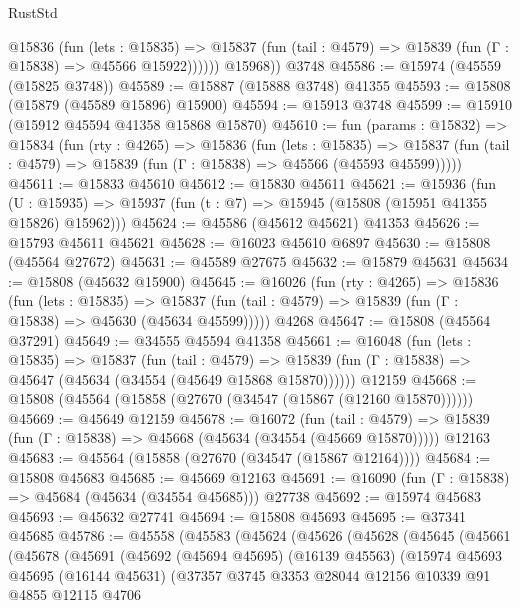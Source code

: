 \begin{lexlean}{RustStd}
\begin{coremodule}
            @15836
              (fun (lets : @15835) =>
              @15837 (fun (tail : @4579) => @15839 (fun (Γ : @15838) => @45566 @15922))))))
        @15968))
    @3748
@45586 := @15974 (@45559 (@15825 @3748))
@45589 := @15887 (@15888 @3748) @41355
@45593 := @15808 (@15879 (@45589 @15896) @15900)
@45594 := @15913 @3748
@45599 := @15910 (@15912 @45594 @41358 @15868 @15870)
@45610 := fun (params : @15832) =>
  @15834
    (fun (rty : @4265) =>
    @15836
      (fun (lets : @15835) =>
      @15837 (fun (tail : @4579) => @15839 (fun (Γ : @15838) => @45566 (@45593 @45599)))))
@45611 := @15833 @45610
@45612 := @15830 @45611
@45621 := @15936
    (fun (U : @15935) => @15937 (fun (t : @7) => @15945 (@15808 (@15951 @41355 @15826) @15962)))
@45624 := @45586 (@45612 @45621) @41353
@45626 := @15793 @45611 @45621
@45628 := @16023 @45610 @6897
@45630 := @15808 (@45564 @27672)
@45631 := @45589 @27675
@45632 := @15879 @45631
@45634 := @15808 (@45632 @15900)
@45645 := @16026
    (fun (rty : @4265) =>
    @15836
      (fun (lets : @15835) =>
      @15837 (fun (tail : @4579) => @15839 (fun (Γ : @15838) => @45630 (@45634 @45599)))))
    @4268
@45647 := @15808 (@45564 @37291)
@45649 := @34555 @45594 @41358
@45661 := @16048
    (fun (lets : @15835) =>
    @15837
      (fun (tail : @4579) =>
      @15839 (fun (Γ : @15838) => @45647 (@45634 (@34554 (@45649 @15868 @15870))))))
    @12159
@45668 := @15808 (@45564 (@15858 (@27670 (@34547 (@15867 (@12160 @15870))))))
@45669 := @45649 @12159
@45678 := @16072
    (fun (tail : @4579) => @15839 (fun (Γ : @15838) => @45668 (@45634 (@34554 (@45669 @15870)))))
    @12163
@45683 := @45564 (@15858 (@27670 (@34547 (@15867 @12164))))
@45684 := @15808 @45683
@45685 := @45669 @12163
@45691 := @16090 (fun (Γ : @15838) => @45684 (@45634 (@34554 @45685))) @27738
@45692 := @15974 @45683
@45693 := @45632 @27741
@45694 := @15808 @45693
@45695 := @37341 @45685
@45786 := @45558
    (@45583
      (@45624
        (@45626
          (@45628
            (@45645
              (@45661
                (@45678
                  (@45691
                    (@45692
                      (@45694 @45695)
                      (@16139 @45563)
                      (@15974
                        @45693
                        @45695
                        (@16144 @45631)
                        (@37357
                          @3745
                          @3353
                          @28044
                          @12156
                          @10339
                          @91
                          @4855
                          @12115
                          @4706

\end{coremodule}
\end{lexlean}
